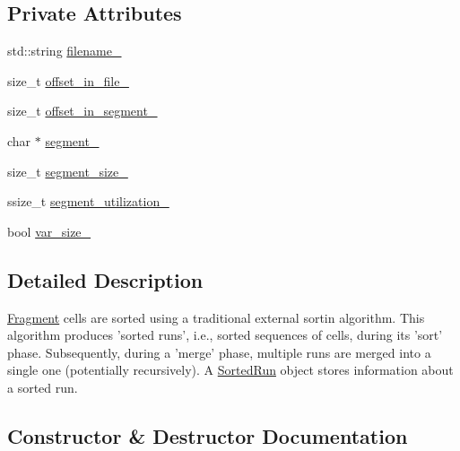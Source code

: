 \subsection*{Private Attributes}
\begin{DoxyCompactItemize}
\item 
std\+::string \hyperlink{classSortedRun_a47af8318f28ffc3242e8b0a5d7ddb9fc}{filename\+\_\+}
\item 
size\+\_\+t \hyperlink{classSortedRun_a9a20d3bda0e5cccbcfa4cf84caae26d2}{offset\+\_\+in\+\_\+file\+\_\+}
\item 
size\+\_\+t \hyperlink{classSortedRun_ad937ca2a46e822d767b465369b65dff5}{offset\+\_\+in\+\_\+segment\+\_\+}
\item 
char $\ast$ \hyperlink{classSortedRun_a7b337cb68dd655e645fc6d6096f55721}{segment\+\_\+}
\item 
size\+\_\+t \hyperlink{classSortedRun_a713facebc827efc8f48d784d970531df}{segment\+\_\+size\+\_\+}
\item 
ssize\+\_\+t \hyperlink{classSortedRun_a06c696f9cb490fe920f620ef42cbf665}{segment\+\_\+utilization\+\_\+}
\item 
bool \hyperlink{classSortedRun_a6777a9e8661c70fac26b87bfe0a1b4fd}{var\+\_\+size\+\_\+}
\end{DoxyCompactItemize}


\subsection{Detailed Description}
\hyperlink{classFragment}{Fragment} cells are sorted using a traditional external sortin algorithm. This algorithm produces 'sorted runs', i.\+e., sorted sequences of cells, during its 'sort' phase. Subsequently, during a 'merge' phase, multiple runs are merged into a single one (potentially recursively). A \hyperlink{classSortedRun}{Sorted\+Run} object stores information about a sorted run. 

\subsection{Constructor \& Destructor Documentation}
\hypertarget{classSortedRun_abb29f8bd7f2913135f89039124e68db2}{}
